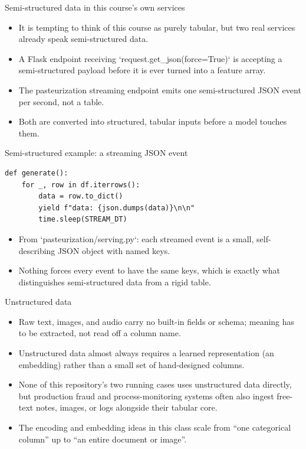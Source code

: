 \begin{frame}{Semi-structured data in this course's own services}
\begin{itemize}
\item It is tempting to think of this course as purely tabular, but two real services already speak semi-structured data.
\item A Flask endpoint receiving `request.get_json(force=True)` is accepting a semi-structured payload before it is ever turned into a feature array.
\item The pasteurization streaming endpoint emits one semi-structured JSON event per second, not a table.
\item Both are converted into structured, tabular inputs before a model touches them.
\end{itemize}
\coursefooter
\end{frame}

\begin{frame}[fragile]{Semi-structured example: a streaming JSON event}
\begin{lstlisting}[style=coursepython]
def generate():
    for _, row in df.iterrows():
        data = row.to_dict()
        yield f"data: {json.dumps(data)}\n\n"
        time.sleep(STREAM_DT)
\end{lstlisting}
\begin{itemize}
\item From `pasteurization/serving.py`: each streamed event is a small, self-describing JSON object with named keys.
\item Nothing forces every event to have the same keys, which is exactly what distinguishes semi-structured data from a rigid table.
\end{itemize}
\coursefooter
\end{frame}

\begin{frame}{Unstructured data}
\begin{itemize}
\item Raw text, images, and audio carry no built-in fields or schema; meaning has to be extracted, not read off a column name.
\item Unstructured data almost always requires a learned representation (an embedding) rather than a small set of hand-designed columns.
\item None of this repository's two running cases uses unstructured data directly, but production fraud and process-monitoring systems often also ingest free-text notes, images, or logs alongside their tabular core.
\item The encoding and embedding ideas in this class scale from ``one categorical column'' up to ``an entire document or image''.
\end{itemize}
\coursefooter
\end{frame}

